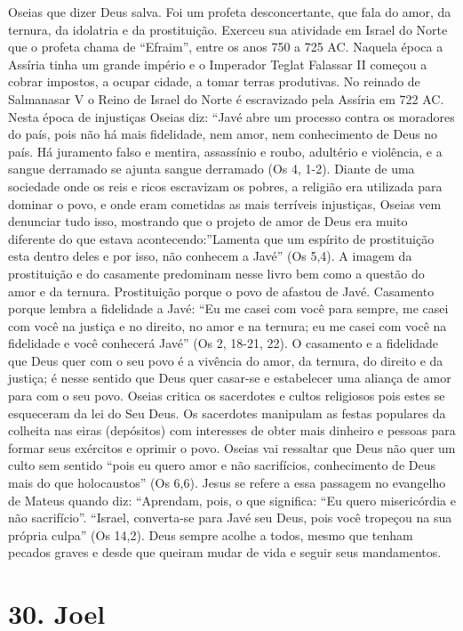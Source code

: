 \documentclass[
]{book}
\begin{document}
Oseias que dizer Deus salva. Foi um profeta desconcertante, que fala do amor, da ternura, da idolatria e da prostituição. Exerceu sua atividade em Israel do Norte que o profeta chama de ``Efraim'', entre os anos 750 a 725 AC. Naquela época a Assíria tinha um grande império e o Imperador Teglat Falassar II começou a cobrar impostos, a ocupar cidade, a tomar terras produtivas. No reinado de Salmanasar V o Reino de Israel do Norte é escravizado pela Assíria em 722 AC. Nesta época de injustiças Oseias diz: ``Javé abre um processo contra os moradores do país, pois não há mais fidelidade, nem amor, nem conhecimento de Deus no país. Há juramento falso e mentira, assassínio e roubo, adultério e violência, e a sangue derramado se ajunta sangue derramado (Os 4, 1-2). Diante de uma sociedade onde os reis e ricos escravizam os pobres, a religião era utilizada para dominar o povo, e onde eram cometidas as mais terríveis injustiças, Oseias vem denunciar tudo isso, mostrando que o projeto de amor de Deus era muito diferente do que estava acontecendo:''Lamenta que um espírito de prostituição esta dentro deles e por isso, não conhecem a Javé'' (Os 5,4). A imagem da prostituição e do casamente predominam nesse livro bem como a questão do amor e da ternura. Prostituição porque o povo de afastou de Javé. Casamento porque lembra a fidelidade a Javé: ``Eu me casei com você para sempre, me casei com você na justiça e no direito, no amor e na ternura; eu me casei com você na fidelidade e você conhecerá Javé'' (Os 2, 18-21, 22). O casamento e a fidelidade que Deus quer com o seu povo é a vivência do amor, da ternura, do direito e da justiça; é nesse sentido que Deus quer casar-se e estabelecer uma aliança de amor para com o seu povo. Oseias critica os sacerdotes e cultos religiosos pois estes se esqueceram da lei do Seu Deus. Os sacerdotes manipulam as festas populares da colheita nas eiras (depósitos) com interesses de obter mais dinheiro e pessoas para formar seus exércitos e oprimir o povo. Oseias vai ressaltar que Deus não quer um culto sem sentido ``pois eu quero amor e não sacrifícios, conhecimento de Deus mais do que holocaustos'' (Os 6,6). Jesus se refere a essa passagem no evangelho de Mateus quando diz: ``Aprendam, pois, o que significa: ``Eu quero misericórdia e não sacrifício''. ``Israel, converta-se para Javé seu Deus, pois você tropeçou na sua própria culpa'' (Os 14,2). Deus sempre acolhe a todos, mesmo que tenham pecados graves e desde que queiram mudar de vida e seguir seus mandamentos.

\hypertarget{joel}{%
\section*{30. Joel}\label{joel}}
\end{document}
